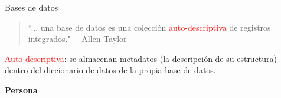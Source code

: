 \begin{frame}{Bases de datos}

    \begin{overlayarea}{\linewidth}{\textheight}
        \begin{onlyenv}
            \begin{block}{}
            \begin{quote}
                ``... una base de datos es una colecci\'on \textcolor{red}{auto-descriptiva} de registros integrados."
                \hspace{1em plus 1fill}---Allen Taylor
            \end{quote}
    
            \textcolor{red}{Auto-descriptiva}: se almacenan metadatos (la descripci\'on de su estructura) dentro
            del diccionario de datos de la propia base de datos.
        \end{block}
      \end{onlyenv}
      
          \vspace{5mm}
          \large \textbf{Persona}
          \vspace{2mm}
    \end{overlayarea}
    


    

   

    
\end{frame}



